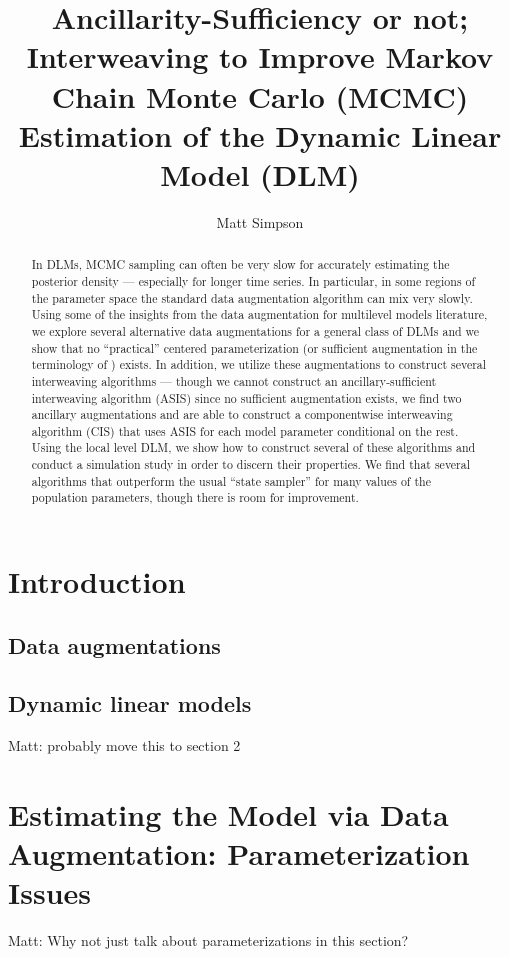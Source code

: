 \documentclass{article}
\newcommand{\matt}[1]{{\color{red} Matt: #1}}
\begin{document}
\title{Ancillarity-Sufficiency or not; Interweaving to Improve Markov Chain Monte Carlo (MCMC) Estimation of the Dynamic Linear Model (DLM)}
\author{Matt Simpson}
\maketitle

\begin{abstract}
In DLMs, MCMC sampling can often be very slow for accurately estimating the posterior density --- especially for longer time series. In particular, in some regions of the parameter space the standard data augmentation algorithm can mix very slowly. Using some of the insights from the data augmentation for multilevel models literature, we explore several alternative data augmentations for a general class of DLMs and we show that no ``practical'' centered parameterization (or sufficient augmentation in the terminology of \citet{yu2011center}) exists. In addition, we utilize these augmentations to construct several interweaving algorithms --- though we cannot construct an ancillary-sufficient interweaving algorithm (ASIS) since no sufficient augmentation exists, we find two ancillary augmentations and are able to construct a componentwise interweaving algorithm (CIS) that uses ASIS for each model parameter conditional on the rest. Using the local level DLM, we show how to construct several of these algorithms and conduct a simulation study in order to discern their properties. We find that several algorithms that outperform the usual ``state sampler'' for many values of the population parameters, though there is room for improvement.
\end{abstract}


\section{Introduction}\label{sec:Intro}

\subsection{Data augmentations}

\subsection{Dynamic linear models} \matt{probably move this to section 2} 




\section{Estimating the Model via Data Augmentation: Parameterization Issues}\label{sec:DLMest}
\matt{Why not just talk about parameterizations in this section?}
\end{document}

